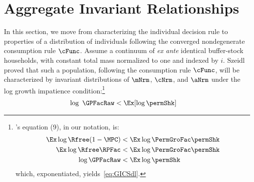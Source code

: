 \documentclass[BufferStockTheory]{subfiles}
\begin{document}
\begin{comment}
\hypertarget{LimitsAsmtToZero}{}
\subsection{Limits as \texorpdfstring{m}{m} Approaches Zero}
\label{subsec:LimitsAsmtToZero}

Equation~\eqref{eq:MPCmaxInv} shows that the limiting value of
$\MPCmax$ is
\begin{align*}
  \MPCmax  & = 1-{\Rfree}^{-1}{(\pZero  \Rfree\DiscFac)}^{1/\CRRA}.
\end{align*}

Defining $\eFunc(\mNrm)=\cFunc(\mNrm)/\mNrm$ we have
\begin{align*}
  \lim_{m \rightarrow 0} \eFunc(\mNrm)  & = (1-\pZero^{1/\CRRA}\RPFac) = \MPCmax .
\end{align*}

Now using the continuous differentiability of the consumption function along with L'H\^opital's rule, we have
\begin{align*}
  \lim_{m \rightarrow 0} \usual{\cFunc}^{\prime}(\mNrm)  & = \lim_{m \rightarrow 0}
                                                          \eFunc(\mNrm) = \MPCmax.
\end{align*}

Figure~\ref{fig:mpclimits} visually confirms that the numerical solution obtains this limit for the MPC as $\mNrm$ approaches zero.
\end{comment}


\hypertarget{The-Aggregate-and-Idiosyncratic-Relationship-Between-Consumption-Growth-and-Income-Growth}{}
\section{Aggregate Invariant Relationships}
In this section, we move from characterizing the individual decision rule to properties of a distribution of individuals following the converged nondegenerate consumption rule $\cFunc$. Assume a continuum of \textit{ex ante} identical buffer-stock households, with constant total mass normalized to one and indexed by $i$. Szeidl~\citeyearpar{szeidlInvariant} proved that such a population, following the consumption rule $\cFunc$, will be characterized by invariant distributions of $\mNrm$, $\cNrm$, and $\aNrm$ under the log growth impatience condition:\footnote{\cite{szeidlInvariant}'s equation (9), in our notation, is:
  \begin{align*}
    \Ex \log \Rfree (1-\MPC) & < \Ex \log \PermGroFac \permShk
    \\  \Ex \log \Rfree \RPFac  &  < \Ex \log \PermGroFac \permShk
    \\ \log \GPFacRaw & < \Ex \log \permShk
  \end{align*}
  which, exponentiated, yields~\eqref{eq:GICSdl}.}
\hypertarget{GICSdl}{}
\begin{align}
   \log~\GPFacRaw & < \Ex [\log \permShk] \label{eq:GICSdl}
\end{align}
\end{document}
